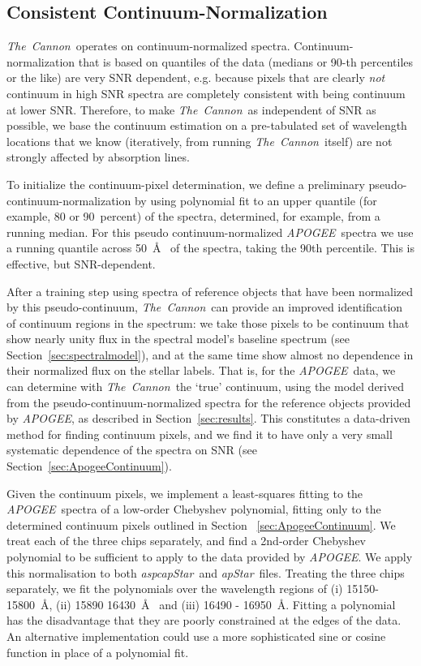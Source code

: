 \documentclass[12pt, preprint]{aastex}
\newcommand{\sectionname}{Section}
\newcommand{\tc}{\textsl{The~Cannon}}
\newcommand{\apogee}{\textsl{APOGEE}}
\newcommand{\aspcapstar}{\textsl{aspcapStar}}
\newcommand{\apstar}{\textsl{apStar}}
\begin{document}
\subsection{Consistent Continuum-Normalization}\label{sec:ContNorm}

\tc\ operates on continuum-normalized spectra.
Continuum-normalization that is based on quantiles of the data (medians or 90-th percentiles or the like)
are very SNR dependent, e.g. because pixels that are clearly \emph{not} continuum in high SNR
spectra are completely consistent with being continuum at lower SNR.
Therefore, to make \tc\ as independent of SNR as possible,
we base the continuum estimation on a pre-tabulated set of wavelength locations that we know
(iteratively, from running \tc\ itself) are not strongly affected by absorption lines.

To initialize the continuum-pixel determination,
we define a preliminary pseudo-continuum-normalization by 
using polynomial fit to an upper quantile (for example, 80 or 90~percent) of the spectra, determined, for example, from a running median. For this pseudo continuum-normalized \apogee\ spectra we use a running quantile across 50~\AA~ of the spectra, taking the 90th percentile. This is effective, but SNR-dependent.
  
After a training step using spectra of reference objects that have been  normalized  by this pseudo-continuum,
 \tc\ can provide an improved identification of continuum regions in the spectrum: 
we take those pixels to be continuum that show nearly unity flux in the spectral model's baseline spectrum (see \sectionname~\ref{sec:spectralmodel}), and at the same time show almost no dependence in their normalized flux on the stellar labels.
That is, for the \apogee\ data, we can determine with \tc\ the `true' continuum, using the model derived from the pseudo-continuum-normalized spectra for the reference objects provided by \apogee, as described in \sectionname~\ref{sec:results}. This constitutes a data-driven method for finding continuum pixels, and we find it to have only a very small systematic dependence of the spectra on SNR (see \sectionname~\ref{sec:ApogeeContinuum}).

Given the continuum pixels, we implement a least-squares fitting to the \apogee\ spectra of a low-order Chebyshev polynomial, fitting only to the determined continuum pixels outlined in Section ~\ref{sec:ApogeeContinuum}. We treat each of the three chips separately, and find a 2nd-order Chebyshev polynomial to be sufficient to apply to the data provided by \apogee. We apply this normalisation to both \aspcapstar\ and \apstar\ files. Treating the three chips separately, we fit the polynomials over the wavelength regions of (i) 15150-15800~\AA, (ii) 15890 16430~\AA~ and (iii) 16490 - 16950~\AA. Fitting a polynomial has the disadvantage that they are poorly constrained at the edges of the data. An alternative implementation could use a more sophisticated sine or cosine function in place of a polynomial fit. 
\end{document}
